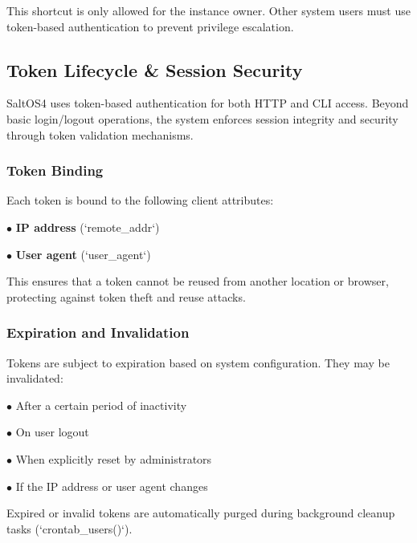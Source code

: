 \documentclass[a4paper]{article}
\begin{document}
This shortcut is only allowed for the instance owner. Other system users must use token-based authentication to prevent privilege escalation.

\hypertarget{toc26}{}
\subsection{Token Lifecycle \& Session Security}

SaltOS4 uses token-based authentication for both HTTP and CLI access. Beyond basic login/logout operations, the system enforces session integrity and security through token validation mechanisms.

\hypertarget{toc27}{}
\subsubsection{Token Binding}

Each token is bound to the following client attributes:

\begin{compactitem}
\item[\color{myblue}$\bullet$] \textbf{IP address} (`remote\_addr`)
\item[\color{myblue}$\bullet$] \textbf{User agent} (`user\_agent`)
\end{compactitem}

This ensures that a token cannot be reused from another location or browser, protecting against token theft and reuse attacks.

\hypertarget{toc28}{}
\subsubsection{Expiration and Invalidation}

Tokens are subject to expiration based on system configuration. They may be invalidated:

  \begin{compactitem}
  \item[\color{myblue}$\bullet$] After a certain period of inactivity
  \item[\color{myblue}$\bullet$] On user logout
  \item[\color{myblue}$\bullet$] When explicitly reset by administrators
  \item[\color{myblue}$\bullet$] If the IP address or user agent changes
  \end{compactitem}

Expired or invalid tokens are automatically purged during background cleanup tasks (`crontab\_users()`).
\end{document}
